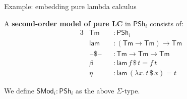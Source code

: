 \documentclass[dvipsnames,aspectratio=169]{beamer}
\newcommand{\ms}[1]{\mathsf{#1}}
\newcommand{\Tm}{\mathsf{Tm}}
\newcommand{\blank}{\mathord{\hspace{1pt}\text{--}\hspace{1pt}}}
\newcommand{\Set}{\mathsf{Set}}
\newcommand{\Base}{\mathsf{Base}}
\newcommand{\In}{\mathsf{In}}
\newcommand{\PSh}{\mathsf{PSh}}
\newcommand{\Cat}{\mathsf{Cat}}
\newcommand{\base}{\mathsf{base}}
\newcommand{\SMod}{\mathsf{SMod}}
\newcommand{\lam}{\ms{lam}}
\begin{document}
\begin{frame}{Example: embedding pure lambda calculus}

\vspace{1em}
A \textbf{second-order model of pure LC} in $\PSh_i$ consists of:
\begin{alignat*}{3}
  & \Tm &&: \PSh_i \\
  & \lam &&: (\Tm \to \Tm) \to \Tm \\
  & \blank\!\$\!\blank &&: \Tm \to \Tm \to \Tm \\
  & \beta && : \lam\,f\,\$\,t = f\,t \\
  & \eta && : \lam\,(\lambda x.\,t\,\$\,x) = t
\end{alignat*}

We define $\SMod_i : \PSh_i$ as the above $\Sigma$-type.
\vspace{2em}
\end{frame}
\end{document}
